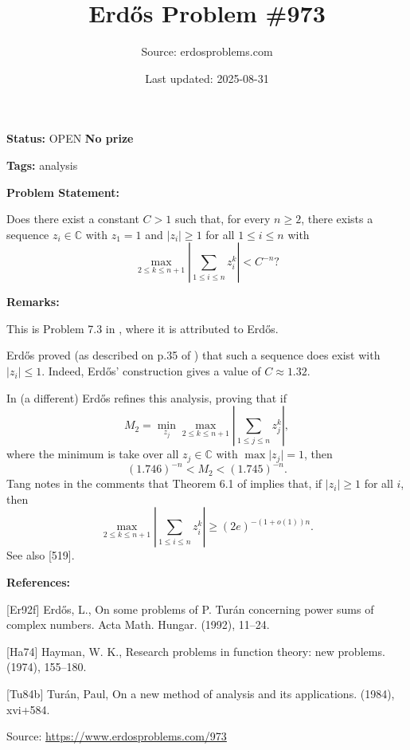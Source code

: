 \documentclass{article}
\title{Erd\H{o}s Problem \#973}
\date{Last updated: 2025-08-31}
\author{Source: erdosproblems.com}
\begin{document}
\maketitle

\noindent\textbf{Status:} OPEN \quad \textbf{No prize}

\noindent\textbf{Tags:} analysis

\medskip
\noindent\textbf{Problem Statement:}

Does there exist a constant $C>1$ such that, for every $n\geq 2$, there exists a sequence $z_i\in \mathbb{C}$ with $z_1=1$ and $\lvert z_i\rvert \geq 1$ for all $1\leq i\leq n$ with\[\max_{2\leq k\leq n+1}\left\lvert \sum_{1\leq i\leq n}z_i^k\right\rvert < C^{-n}?\]

\bigskip
\noindent\textbf{Remarks:}

This is Problem 7.3 in \cite{Ha74}, where it is attributed to Erd\H{o}s.

Erd\H{o}s proved (as described on p.35 of \cite{Tu84b}) that such a sequence does exist with $\lvert z_i\rvert\leq 1$. Indeed, Erd\H{o}s' construction gives a value of $C\approx 1.32$. 

In \cite{Er92f} (a different) Erd\H{o}s refines this analysis, proving that if\[M_2=\min_{z_j} \max_{2\leq k\leq n+1} \left\lvert \sum_{1\leq j\leq n}z_j^k\right\rvert,\]where the minimum is take over all $z_j\in \mathbb{C}$ with $\max \lvert z_j\rvert=1$, then\[(1.746)^{-n} < M_2 < (1.745)^{-n}.\]Tang notes in the comments that Theorem 6.1 of \cite{Tu84b} implies that, if $\lvert z_i\rvert \geq 1$ for all $i$, then\[\max_{2\leq k\leq n+1}\left\lvert \sum_{1\leq i\leq n}z_i^k\right\rvert \geq (2e)^{-(1+o(1))n}.\]See also [519].

\bigskip
\noindent\textbf{References:}

[Er92f] Erd\H{o}s, L., On some problems of {P}. Tur\'{a}n concerning power sums of
complex numbers. Acta Math. Hungar. (1992), 11--24.
 
 [Ha74] Hayman, W. K., Research problems in function theory: new problems. (1974), 155--180.
 
 [Tu84b] Tur\'{a}n, Paul, On a new method of analysis and its applications. (1984), xvi+584.

\bigskip
\noindent\small{Source: \url{https://www.erdosproblems.com/973}}
\end{document}
